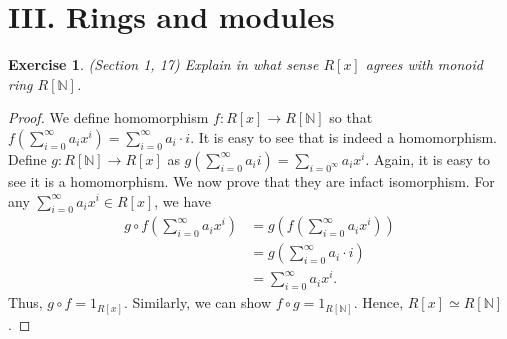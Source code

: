 \documentclass[a4paper, 11pt]{book}
\theoremstyle{plain}
\newtheorem{exercise}{Exercise}
\theoremstyle{plain}
\newcommand{\arr}{\rightarrow}
\newcommand{\N}{\mathbb{N}}
\begin{document}
\chapter*{III. Rings and modules}
  \begin{exercise} (Section 1, 17)
    Explain in what sense $R[x]$ agrees with monoid ring $R[\N]$.
  \end{exercise}
  \begin{proof}
    We define homomorphism $f:R[x] \arr R[\N]$ so that $f \left( \sum_{i=0}^\infty a_i x^i \right) = \sum_{i=0}^\infty a_i \cdot i$. It is easy to see that is indeed a homomorphism. Define $g: R[\N] \arr R[x]$ as $g\left( \sum_{i=0}^\infty a_i i \right)=\sum_{i=0^\infty} a_i x^i$. Again, it is easy to see it is a homomorphism. We now prove that they are infact isomorphism. For any $\sum_{i=0}^\infty a_i x^i \in R[x]$, we have 
    \begin{align*}
      g \circ f \left(\sum_{i=0}^\infty a_i x^i \right) &= g \left(f \left(\sum_{i=0}^\infty a_i x^i \right) \right) \\
      &=g \left( \sum_{i=0}^\infty a_i \cdot i \right) \\
      &=\sum_{i=0}^\infty a_i x^i.
    \end{align*}
    Thus, $g \circ f=1_{R[x]}$. Similarly, we can show $f \circ g = 1_{R[\N]}$. Hence, $R[x] \simeq R[\N]$.
  \end{proof}
\end{document}
